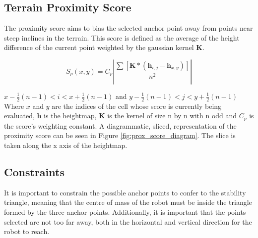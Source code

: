     \subsection{Terrain Proximity Score}
    The proximity score aims to bias the selected anchor point away from points near steep inclines in the terrain. This score is defined as the average of the height
    difference of the current point weighted by the gaussian kernel \(\boldsymbol{K}\).

    \begin{equation}
        S_p(x,y) = C_p\left|\frac{\sum\left[\boldsymbol{K}*(\boldsymbol{h}_{i,j}-\boldsymbol{h}_{x,y})\right]}{n^2}\right|
    \end{equation}

    \(x-\frac{1}{2}(n-1)<i<x+\frac{1}{2}(n-1)\) and \(y-\frac{1}{2}(n-1)<j<y+\frac{1}{2}(n-1)\)\\

    Where \(x\) and \(y\) are the indices of the cell whose score is currently being evaluated, \(\boldsymbol{h}\) is the
    heightmap, \(\boldsymbol{K}\) is the kernel of size n by n with n odd and \(C_p\) is the score's weighting constant.
    A diagrammatic, sliced, representation of the proximity score can be seen in Figure \ref{fig:prox_score_diagram}. The
    slice is taken along the x axis of the heightmap.

    \subsection{Constraints}
    It is important to constrain the possible anchor points to confer to the stability triangle,
    meaning that the centre of mass of the robot must be inside the triangle formed by the three
    anchor points. Additionally, it is important that the points selected are not too far away,
    both in the horizontal and vertical direction for the robot to reach.


